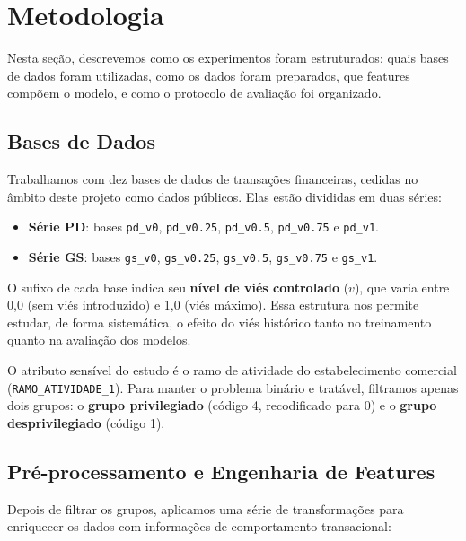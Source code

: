 \section{Metodologia}
\label{sec:metodologia}

Nesta seção, descrevemos como os experimentos foram estruturados: quais bases de dados foram utilizadas, como os dados foram preparados, que features compõem o modelo, e como o protocolo de avaliação foi organizado.

\subsection{Bases de Dados}

Trabalhamos com dez bases de dados de transações financeiras, cedidas no âmbito deste projeto como dados públicos. Elas estão divididas em duas séries:

\begin{itemize}
    \item \textbf{Série PD}: bases \texttt{pd\_v0}, \texttt{pd\_v0.25}, \texttt{pd\_v0.5}, \texttt{pd\_v0.75} e \texttt{pd\_v1}.
    \item \textbf{Série GS}: bases \texttt{gs\_v0}, \texttt{gs\_v0.25}, \texttt{gs\_v0.5}, \texttt{gs\_v0.75} e \texttt{gs\_v1}.
\end{itemize}

O sufixo de cada base indica seu \textbf{nível de viés controlado} ($v$), que varia entre 0,0 (sem viés introduzido) e 1,0 (viés máximo). Essa estrutura nos permite estudar, de forma sistemática, o efeito do viés histórico tanto no treinamento quanto na avaliação dos modelos.

O atributo sensível do estudo é o ramo de atividade do estabelecimento comercial (\texttt{RAMO\_ATIVIDADE\_1}). Para manter o problema binário e tratável, filtramos apenas dois grupos: o \textbf{grupo privilegiado} (código 4, recodificado para 0) e o \textbf{grupo desprivilegiado} (código 1).

\subsection{Pré-processamento e Engenharia de Features}

Depois de filtrar os grupos, aplicamos uma série de transformações para enriquecer os dados com informações de comportamento transacional:

